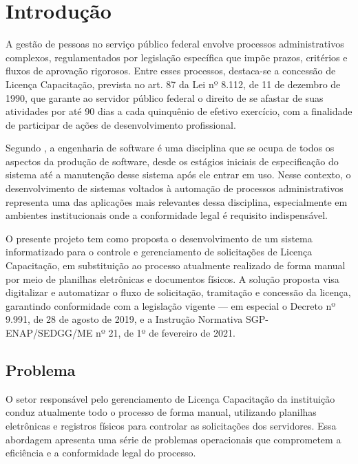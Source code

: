 \chapter{Introdução}
\label{cap:introducao}

A gestão de pessoas no serviço público federal envolve processos administrativos complexos, regulamentados por legislação específica que impõe prazos, critérios e fluxos de aprovação rigorosos. Entre esses processos, destaca-se a concessão de Licença Capacitação, prevista no art. 87 da Lei nº 8.112, de 11 de dezembro de 1990, que garante ao servidor público federal o direito de se afastar de suas atividades por até 90 dias a cada quinquênio de efetivo exercício, com a finalidade de participar de ações de desenvolvimento profissional.

Segundo \textcite{pressman_engenharia}, a engenharia de software é uma disciplina que se ocupa de todos os aspectos da produção de software, desde os estágios iniciais de especificação do sistema até a manutenção desse sistema após ele entrar em uso. Nesse contexto, o desenvolvimento de sistemas voltados à automação de processos administrativos representa uma das aplicações mais relevantes dessa disciplina, especialmente em ambientes institucionais onde a conformidade legal é requisito indispensável.

O presente projeto tem como proposta o desenvolvimento de um sistema informatizado para o controle e gerenciamento de solicitações de Licença Capacitação, em substituição ao processo atualmente realizado de forma manual por meio de planilhas eletrônicas e documentos físicos. A solução proposta visa digitalizar e automatizar o fluxo de solicitação, tramitação e concessão da licença, garantindo conformidade com a legislação vigente — em especial o Decreto nº 9.991, de 28 de agosto de 2019, e a Instrução Normativa SGP-ENAP/SEDGG/ME nº 21, de 1º de fevereiro de 2021.

\section{Problema}

O setor responsável pelo gerenciamento de Licença Capacitação da instituição conduz atualmente todo o processo de forma manual, utilizando planilhas eletrônicas e registros físicos para controlar as solicitações dos servidores. Essa abordagem apresenta uma série de problemas operacionais que comprometem a eficiência e a conformidade legal do processo.

